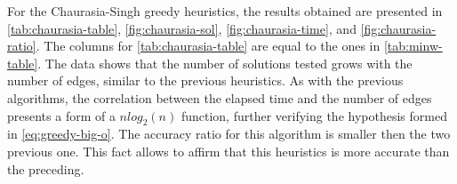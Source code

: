 For the Chaurasia-Singh greedy heuristics, the results obtained are presented in \autoref{tab:chaurasia-table}, \autoref{fig:chaurasia-sol}, \autoref{fig:chaurasia-time}, and \autoref{fig:chaurasia-ratio}. 
The columns for \autoref{tab:chaurasia-table} are equal to the ones in \autoref{tab:minw-table}.
The data shows that the number of solutions tested grows with the number of edges, similar to the previous heuristics.
As with the previous algorithms, the correlation between the elapsed time and the number of edges presents a form of a $nlog_2(n)$ function, further verifying the hypothesis formed in \autoref{eq:greedy-big-o}.
The accuracy ratio for this algorithm is smaller then the two previous one.
This fact allows to affirm that this heuristics is more accurate than the preceding.

\newpage

